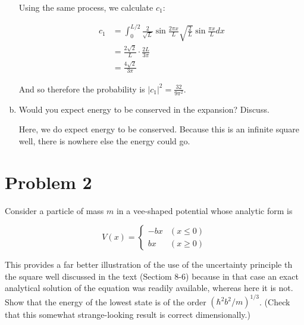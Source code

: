 \documentclass[10pt]{article}
\begin{document}
\begin{enumerate}[(a)]
        \begin{solution}
            Using the same process, we calculate $c_1$: 


            \begin{align*}
                c_1 &= \int_0^{L/2} \frac{2}{\sqrt{L}} \sin \frac{2\pi x}{L} \sqrt{\frac 2L} \sin \frac{\pi x}{L} dx\\
                &= \frac{2\sqrt 2}{L} \cdot \frac{2L}{3\pi}\\
                &= \frac{4 \sqrt 2}{3\pi}
            \end{align*}

            And so therefore the probability is $|c_1|^2 = \frac{32}{9\pi^2}$.
        \end{solution}

        \item Would you expect energy to be conserved in the expansion? Discuss. 
        
        \begin{solution}
            Here, we do expect energy to be conserved. Because this is an infinite square well, there is nowhere else the energy could go.
        \end{solution}
    \end{enumerate}

    \pagebreak

    \section*{Problem 2}

    Consider a particle of mass $m$ in a vee-shaped potential whose analytic form is 

    \[ V(x) = \begin{cases}
        -bx & (x \le 0)\\
        bx & (x \ge 0)
    \end{cases}\]

    This provides a far better illustration of the use of the uncertainty principle th the square well discussed in the text (Sectiom 8-6) because in that case an exact analytical solution of the \schrodinger equation was readily available, whereas here it is not. Show that the energy of the lowest state is of the order $(\hbar^2 b^2/m)^{1/3}$. (Check that this somewhat strange-looking result is correct dimensionally.)
\end{document}
